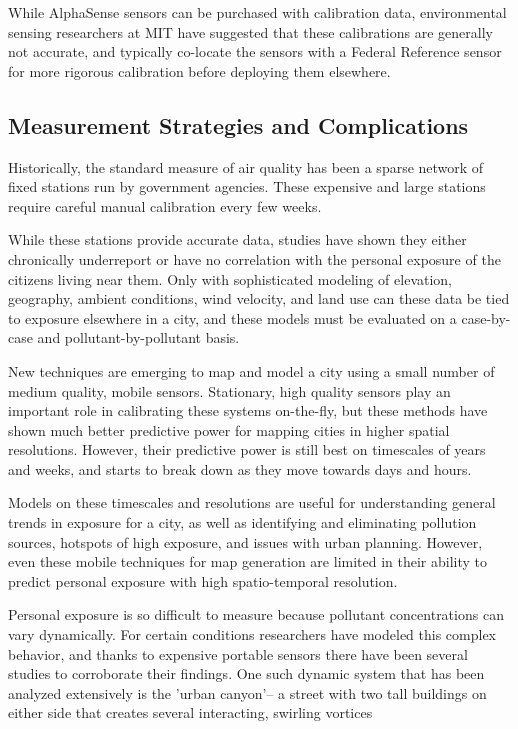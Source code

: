 While AlphaSense sensors can be purchased with calibration data, environmental sensing researchers at MIT have suggested that these calibrations are generally not accurate, and typically co-locate the sensors with a Federal Reference sensor for more rigorous calibration before deploying them elsewhere. \cite{personal2015}

\subsection{Measurement Strategies and Complications}

Historically, the standard measure of air quality has been a sparse network of fixed stations run by government agencies.  These expensive and large stations require careful manual calibration every few weeks.
	
While these stations provide accurate data, studies have shown they either chronically underreport or have no correlation with the personal exposure of the citizens living near them. \cite{steinle2013} Only with sophisticated modeling of elevation, geography, ambient conditions, wind velocity, and land use can these data be tied to exposure elsewhere in a city, and these models must be evaluated on a case-by-case and pollutant-by-pollutant basis.  
	
New techniques are emerging to map and model a city using a small number of medium quality, mobile sensors. \cite{hasen2014} Stationary, high quality sensors play an important role in calibrating these systems on-the-fly, but these methods have shown much better predictive power for mapping cities in higher spatial resolutions.  However, their predictive power is still best on timescales of years and weeks, and starts to break down as they move towards days and hours.

Models on these timescales and resolutions are useful for understanding general trends in exposure for a city, as well as identifying and eliminating pollution sources, hotspots of high exposure, and issues with urban planning.  However, even these mobile techniques for map generation are limited in their ability to predict personal exposure with high spatio-temporal resolution.

Personal exposure is so difficult to measure because pollutant concentrations can vary dynamically.  For certain conditions researchers have modeled this complex behavior, and thanks to expensive portable sensors there have been several studies to corroborate their findings.  One such dynamic system that has been analyzed extensively is the 'urban canyon'-- a street with two tall buildings on either side that creates several interacting, swirling vortices \cite{vard2003}

